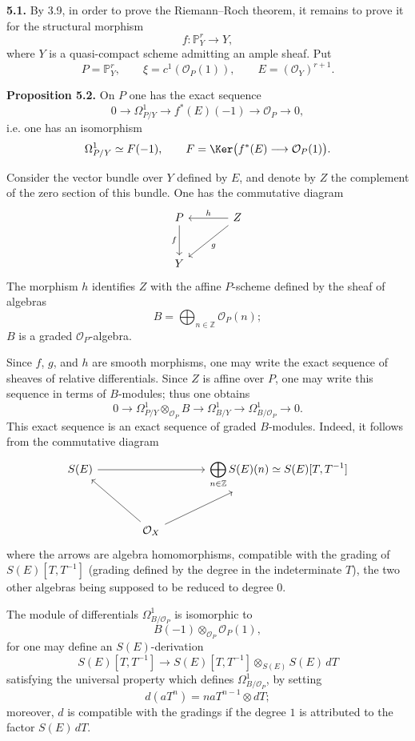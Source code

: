 \textbf{5.1.} By 3.9, in order to prove the Riemann--Roch theorem, it remains to prove it for the structural morphism
\[
f:\mathbb P^r_Y\longrightarrow Y,
\]
where \(Y\) is a quasi-compact scheme admitting an ample sheaf. Put
\[
P=\mathbb P^r_Y,\qquad \xi=c^1(\mathcal O_P(1)),\qquad E=(\mathcal O_Y)^{r+1}.
\]

\textbf{Proposition 5.2.} On \(P\) one has the exact sequence
\[
0\longrightarrow\Omega^1_{P/Y}\longrightarrow f^*(E)(-1)\longrightarrow\mathcal O_P\longrightarrow0,
\]
i.e. one has an isomorphism
\[
\Omega^1_{P/Y}\simeq F(-1),
\qquad
F=\Ker\bigl(f^*(E)\longrightarrow\mathcal O_P(1)\bigr).
\]

Consider the vector bundle over \(Y\) defined by \(E\), and denote by \(Z\) the complement of the zero section of this bundle. One has the commutative diagram
\[
\begin{tikzcd}[column sep=large,row sep=large]
P \arrow[d,"f"'] & Z \arrow[l,"h"'] \arrow[dl,"g"]\\
Y &
\end{tikzcd}
\]
The morphism \(h\) identifies \(Z\) with the affine \(P\)-scheme defined by the sheaf of algebras
\[
B=\bigoplus_{n\in\mathbb Z}\mathcal O_P(n);
\]
\(B\) is a graded \(\mathcal O_P\)-algebra.

Since \(f\), \(g\), and \(h\) are smooth morphisms, one may write the exact sequence of sheaves of relative differentials. Since \(Z\) is affine over \(P\), one may write this sequence in terms of \(B\)-modules; thus one obtains
\begin{equation}\tag{5.2.1}
0\longrightarrow
 \Omega^1_{P/Y}\otimes_{\mathcal O_P}B
\longrightarrow
 \Omega^1_{B/Y}
\longrightarrow
 \Omega^1_{B/\mathcal O_P}
\longrightarrow0 .
\end{equation}
This exact sequence is an exact sequence of graded \(B\)-modules. Indeed, it follows from the commutative diagram
\[
\begin{tikzcd}[column sep=large,row sep=large]
S(E) \arrow[rr] && \displaystyle\bigoplus_{n\in\mathbb Z}S(E)(n)\simeq S(E)[T,T^{-1}]\\
& \mathcal O_X \arrow[ul] \arrow[ur] &
\end{tikzcd}
\]
where the arrows are algebra homomorphisms, compatible with the grading of \(S(E)[T,T^{-1}]\) (grading defined by the degree in the indeterminate \(T\)), the two other algebras being supposed to be reduced to degree \(0\).

The module of differentials \(\Omega^1_{B/\mathcal O_P}\) is isomorphic to
\[
 B(-1)\otimes_{\mathcal O_P}\mathcal O_P(1),
\]
for one may define an \(S(E)\)-derivation
\[
S(E)[T,T^{-1}]
\longrightarrow
S(E)[T,T^{-1}]\otimes_{S(E)}S(E)\,dT
\]
satisfying the universal property which defines \(\Omega^1_{B/\mathcal O_P}\), by setting
\[
 d(aT^n)=naT^{n-1}\otimes dT;
\]
moreover, \(d\) is compatible with the gradings if the degree \(1\) is attributed to the factor \(S(E)\,dT\).

